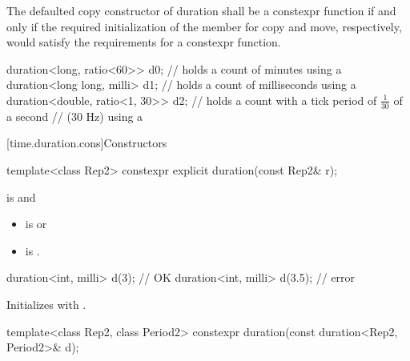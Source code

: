 \pnum
The defaulted copy constructor of duration shall be a
constexpr function if and only if the required initialization
of the member  for copy and move, respectively, would
satisfy the requirements for a constexpr function.

\pnum
\begin{example}
\begin{codeblock}
duration<long, ratio<60>> d0;       // holds a count of minutes using a 
duration<long long, milli> d1;      // holds a count of milliseconds using a 
duration<double, ratio<1, 30>>  d2; // holds a count with a tick period of $\frac{1}{30}$ of a second
                                    // (30 Hz) using a 
\end{codeblock}
\end{example}

[time.duration.cons]{Constructors}

%
\begin{itemdecl}
template<class Rep2>
  constexpr explicit duration(const Rep2& r);
\end{itemdecl}

\begin{itemdescr}
\pnum
\constraints
{} is  and
\begin{itemize}
\item {} is  or
\item {} is .
\end{itemize}
\begin{example}
\begin{codeblock}
duration<int, milli> d(3);          // OK
duration<int, milli> d(3.5);        // error
\end{codeblock}
\end{example}

\pnum
\effects
Initializes  with .
\end{itemdescr}

%
\begin{itemdecl}
template<class Rep2, class Period2>
  constexpr duration(const duration<Rep2, Period2>& d);
\end{itemdecl}

